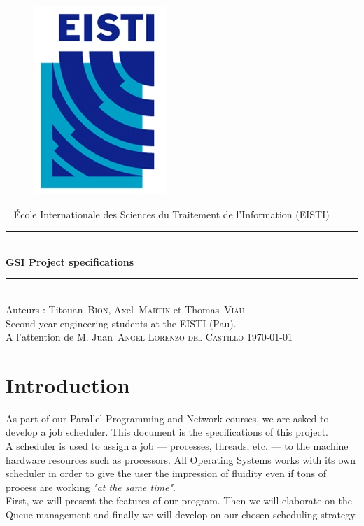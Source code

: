 \documentclass[a4paper,11pt]{article}
\newcommand*{\HRule}{\rule{\linewidth}{0.4mm}}  %
\newcommand*{\auteur}[2]{\large #1~\textsc{#2}} %
\newcommand{\pretitre}{École Internationale des Sciences du Traitement de l'Information (EISTI)}
\newcommand{\grostitre}{GSI Project specifications}
\newcommand{\auteurs}{Auteurs : \auteur{Titouan}{Bion}, \auteur{Axel}{Martin} et \auteur{Thomas}{Viau} \\ Second year engineering students at the EISTI (Pau).}
\newcommand{\correcteurs}{A l'attention de M. \auteur{Juan}{Angel Lorenzo del Castillo}}
\newcommand{\madate}{\today} %
\begin{document}


\begin{titlepage}
\begin{figure}[h]
\includegraphics[scale=1]{images/Logo_EISTI.jpg}
\hfill
\end{figure}
  \begin{center}
    ~
    \vfill
    {\large\pretitre\\}           %
    \vspace{2cm}
    \HRule \\[0.4cm]
    {\Huge\bf\grostitre\\[0.4cm]} %
    \HRule \\[0.4cm]
    \vspace{2cm}
    \auteurs\\                    %
    \medskip
    \vfill
   	\correcteurs
    \vfill
    {\large\madate}               %
  \end{center}
\end{titlepage}



\tableofcontents

\newpage

\section{Introduction}

As part of our Parallel Programming and Network courses, we are asked to develop a job scheduler. This document is the specifications of this project.\\
A scheduler is used to assign a job --- processes, threads, etc. --- to the machine hardware resources such as processors. All Operating Systems works with its own scheduler in order to give the user the impression of fluidity even if tons of process are working \textit{"at the same time"}.\\
First, we will present the features of our program. Then we will elaborate on the Queue management and finally we will develop on our chosen scheduling strategy.
\end{document}
